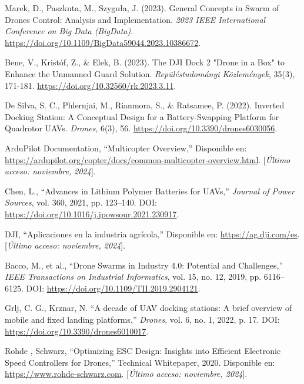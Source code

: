 
\begin{thebibliography}{30}

     Marek, D., Paszkuta, M., Szyguła, J. (2023). General Concepts in Swarm of Drones Control: Analysis and Implementation. \textit{2023 IEEE International Conference on Big Data (BigData)}. \url{https://doi.org/10.1109/BigData59044.2023.10386672}.
  
     Bene, V., Kristóf, Z., \& Elek, B. (2023). The DJI Dock 2 "Drone in a Box" to Enhance the Unmanned Guard Solution. \textit{Repüléstudományi Közlemények}, 35(3), 171-181. \url{https://doi.org/10.32560/rk.2023.3.11}.
   
     De Silva, S. C., Phlernjai, M., Rianmora, S., \& Ratsamee, P. (2022). Inverted Docking Station: A Conceptual Design for a Battery-Swapping Platform for Quadrotor UAVs. \textit{Drones}, 6(3), 56. \url{https://doi.org/10.3390/drones6030056}.

    ArduPilot Documentation, ``Multicopter Overview,'' Disponible en: \url{https://ardupilot.org/copter/docs/common-multicopter-overview.html}. [\textit{Último acceso: noviembre, 2024}].

    Chen, L., ``Advances in Lithium Polymer Batteries for UAVs,'' \textit{Journal of Power Sources}, vol. 360, 2021, pp. 123--140. DOI: \url{https://doi.org/10.1016/j.jpowsour.2021.230917}.

    DJI, ``Aplicaciones en la industria agrícola,'' Disponible en: \url{https://ag.dji.com/es}. [\textit{Último acceso: noviembre, 2024}].

    Bacco, M., et al., ``Drone Swarms in Industry 4.0: Potential and Challenges,'' \textit{IEEE Transactions on Industrial Informatics}, vol. 15, no. 12, 2019, pp. 6116--6125. DOI: \url{https://doi.org/10.1109/TII.2019.2904121}.

    Grlj, C. G., Krznar, N. ``A decade of UAV docking stations: A brief overview of mobile and fixed landing platforms,'' \textit{Drones}, vol. 6, no. 1, 2022, p. 17. DOI: \url{https://doi.org/10.3390/drones6010017}.

    

    Rohde , Schwarz, ``Optimizing ESC Design: Insights into Efficient Electronic Speed Controllers for Drones,'' Technical Whitepaper, 2020. Disponible en: \url{https://www.rohde-schwarz.com}. [\textit{Último acceso: noviembre, 2024}].


\end{thebibliography}
